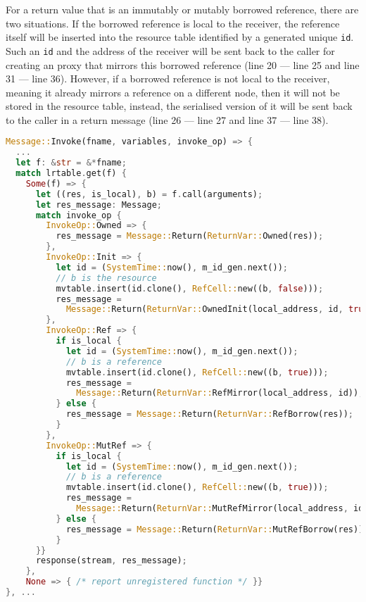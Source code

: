 For a return value that is an immutably or mutably borrowed reference, there are two situations. 
If the borrowed reference is local to the receiver, the reference itself will be inserted into the resource table identified by a generated unique \texttt{id}. Such an \texttt{id} and the address of the receiver will be sent back to the caller for creating an proxy that mirrors this borrowed reference (line 20 --- line 25 and line 31 --- line 36). 
However, if a borrowed reference is not local to the receiver, meaning it already mirrors a reference on a different node, then it will not be stored in the resource table, instead, the serialised version of it will be sent back to the caller in a return message (line 26 --- line 27 and line 37 --- line 38).
\begin{lstlisting}[language=Rust, style=boxed, basicstyle=\footnotesize\ttfamily, caption={Executing an invocation and returning the result}, label=chap3:impl:lst:exec-return]
Message::Invoke(fname, variables, invoke_op) => {
  ...
  let f: &str = &*fname; 
  match lrtable.get(f) {
    Some(f) => {
      let ((res, is_local), b) = f.call(arguments);
      let res_message: Message;
      match invoke_op {
        InvokeOp::Owned => { 
          res_message = Message::Return(ReturnVar::Owned(res)); 
        },
        InvokeOp::Init => {
          let id = (SystemTime::now(), m_id_gen.next());
          // b is the resource
          mvtable.insert(id.clone(), RefCell::new((b, false)));
          res_message = 
            Message::Return(ReturnVar::OwnedInit(local_address, id, true));
        },
        InvokeOp::Ref => {
          if is_local {
            let id = (SystemTime::now(), m_id_gen.next());
            // b is a reference
            mvtable.insert(id.clone(), RefCell::new((b, true)));
            res_message =
              Message::Return(ReturnVar::RefMirror(local_address, id));
          } else { 
            res_message = Message::Return(ReturnVar::RefBorrow(res)); 
          }
        },
        InvokeOp::MutRef => {
          if is_local {
            let id = (SystemTime::now(), m_id_gen.next());
            // b is a reference
            mvtable.insert(id.clone(), RefCell::new((b, true)));
            res_message =
              Message::Return(ReturnVar::MutRefMirror(local_address, id));
          } else { 
            res_message = Message::Return(ReturnVar::MutRefBorrow(res)); 
          }
      }}
      response(stream, res_message);
    },
    None => { /* report unregistered function */ }}
}, ...
\end{lstlisting}


